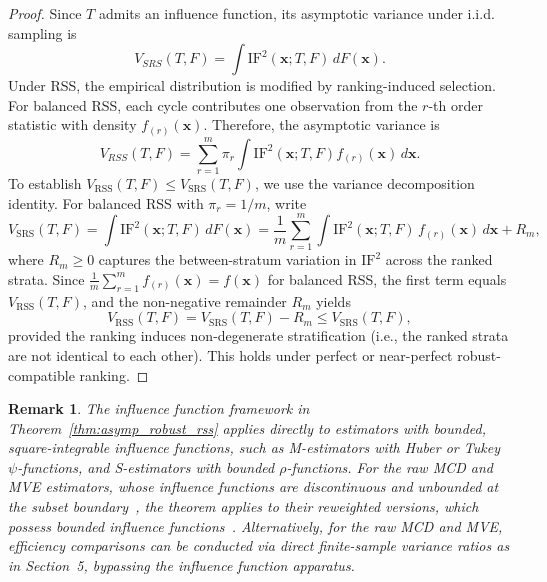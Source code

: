 \documentclass[12pt]{article}
\newtheorem{remark}{Remark}[section]
\begin{document}
\begin{proof}
Since $T$ admits an influence function, its asymptotic variance under i.i.d. sampling is
\begin{equation}
V_{SRS}(T, F) = \int \mathrm{IF}^2(\mathbf{x}; T, F) \, dF(\mathbf{x}).
\end{equation}
Under RSS, the empirical distribution is modified by ranking-induced selection. For balanced RSS, each cycle contributes one observation from the $r$-th order statistic with density $f_{(r)}(\mathbf{x})$. Therefore, the asymptotic variance is
\begin{equation}
V_{RSS}(T, F) = \sum_{r=1}^{m} \pi_r \int \mathrm{IF}^2(\mathbf{x}; T, F) f_{(r)}(\mathbf{x}) \, d\mathbf{x}.
\end{equation}
To establish $V_{\mathrm{RSS}}(T, F) \leq V_{\mathrm{SRS}}(T, F)$, we use the variance decomposition identity. For balanced RSS with $\pi_r = 1/m$, write
\[
V_{\mathrm{SRS}}(T, F) = \int \mathrm{IF}^2(\mathbf{x}; T, F)\, dF(\mathbf{x}) = \frac{1}{m}\sum_{r=1}^{m}\int \mathrm{IF}^2(\mathbf{x}; T, F)\, f_{(r)}(\mathbf{x})\, d\mathbf{x} + R_m,
\]
where $R_m \geq 0$ captures the between-stratum variation in $\mathrm{IF}^2$ across the ranked strata. Since $\frac{1}{m}\sum_{r=1}^{m} f_{(r)}(\mathbf{x}) = f(\mathbf{x})$ for balanced RSS, the first term equals $V_{\mathrm{RSS}}(T, F)$, and the non-negative remainder $R_m$ yields
\begin{equation}
V_{\mathrm{RSS}}(T, F) = V_{\mathrm{SRS}}(T, F) - R_m \leq V_{\mathrm{SRS}}(T, F),
\end{equation}
provided the ranking induces non-degenerate stratification (i.e., the ranked strata are not identical to each other). This holds under perfect or near-perfect robust-compatible ranking.
\end{proof}
\begin{remark}\label{rem:nonsmooth_IF}
The influence function framework in Theorem~\ref{thm:asymp_robust_rss} applies directly to estimators with bounded, square-integrable influence functions, such as M-estimators with Huber or Tukey $\psi$-functions, and S-estimators with bounded $\rho$-functions. For the raw MCD and MVE estimators, whose influence functions are discontinuous and unbounded at the subset boundary~\citep{croux:haes:1999}, the theorem applies to their \emph{reweighted} versions, which possess bounded influence functions~\citep{maronna2019robust}. Alternatively, for the raw MCD and MVE, efficiency comparisons can be conducted via direct finite-sample variance ratios as in Section~5, bypassing the influence function apparatus.
\end{remark}
\end{document}

